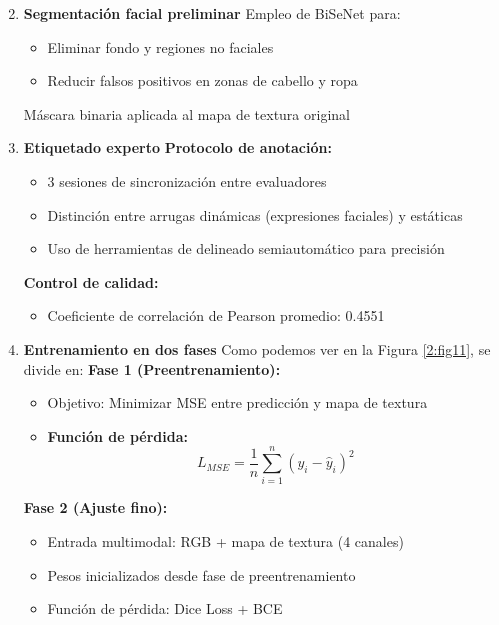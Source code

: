 \begin{enumerate}
	\setcounter{enumi}{1}
    \item \textbf{Segmentación facial preliminar}
    Empleo de BiSeNet para:
    \begin{itemize}[label=$\bullet$, leftmargin=1em]
        \item Eliminar fondo y regiones no faciales
        \item Reducir falsos positivos en zonas de cabello y ropa
    \end{itemize}
    Máscara binaria aplicada al mapa de textura original


    \item \textbf{Etiquetado experto}
    \textbf{Protocolo de anotación:}
    \begin{itemize}[label=$\bullet$, leftmargin=1em]
        \item 3 sesiones de sincronización entre evaluadores
        \item Distinción entre arrugas dinámicas (expresiones faciales) y estáticas
        \item Uso de herramientas de delineado semiautomático para precisión
    \end{itemize}
    \textbf{Control de calidad:}
    \begin{itemize}[label=$\bullet$, leftmargin=1em]
        \item Coeficiente de correlación de Pearson promedio: 0.4551
    \end{itemize}


    \item \textbf{Entrenamiento en dos fases}
    Como podemos ver en la Figura \ref{2:fig11}, se divide en:
    \textbf{Fase 1 (Preentrenamiento):}
    \begin{itemize}[label=$\bullet$, leftmargin=1em]
        \item Objetivo: Minimizar MSE entre predicción y mapa de textura
        \item \textbf{Función de pérdida:}
        $$
        L_{MSE} = \frac{1}{n} \sum_{i=1}^{n} (y_i - \hat{y}_i)^2
        $$
    \end{itemize}
    \textbf{Fase 2 (Ajuste fino):}
    \begin{itemize}[label=$\bullet$, leftmargin=1em]
        \item Entrada multimodal: RGB + mapa de textura (4 canales)
        \item Pesos inicializados desde fase de preentrenamiento
        \item Función de pérdida: Dice Loss + BCE
    \end{itemize}

\end{enumerate}

